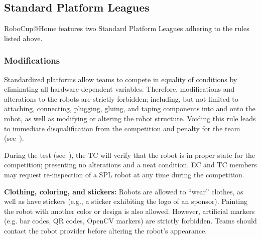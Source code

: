 \subsection{Standard Platform Leagues}
RoboCup@Home features two Standard Platform Leagues adhering to the rules listed above.

\subsubsection{Modifications}
\label{rule:spl-mods}
Standardized platforms allow teams to compete in equality of conditions by eliminating all hardware-dependent variables.
Therefore, modifications and alterations to the robots are strictly forbidden; including, but not limited to attaching, connecting, plugging, gluing, and taping components into and onto the robot, as well as modifying or altering the robot structure.
Voiding this rule leads to immediate disqualification from the competition and penalty for the team (see~).

During the  test (see~), the TC will verify that the robot is in proper state for the competition; presenting no alterations and a neat condition.
EC and TC members may request re-inspection of a SPL robot at any time during the competition.

\textbf{Clothing, coloring, and stickers:} Robots are allowed to \enquote{wear} clothes, as well as have stickers (e.g., a sticker exhibiting the logo of an sponsor).
Painting the robot with another color or design is also allowed.
However, artificial markers (e.g. bar codes, QR codes, OpenCV markers) are strictly forbidden.
Teams should contact the robot provider before altering the robot's appearance.


